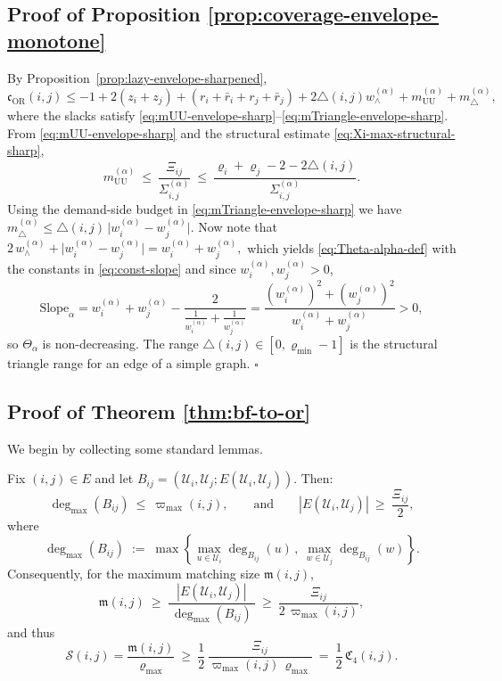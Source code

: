 \documentclass[twoside,11pt]{article}
\numberwithin{equation}{section}
\numberwithin{theorem}{section}
\numberwithin{example}{section}
\begin{document}
\subsection{Proof of Proposition \ref{prop:coverage-envelope-monotone}}
By Proposition~\ref{prop:lazy-envelope-sharpened},
\(
\mathfrak c_{\mathrm{OR}}(i,j) \le
-1+2(z_i+z_j)
+(r_i+\bar r_i+r_j+\bar r_j)
+2\triangle(i,j)w^{(\alpha)}_\wedge
+m^{(\alpha)}_{\mathrm{UU}}
+m^{(\alpha)}_{\triangle},
\)
where the slacks satisfy \eqref{eq:mUU-envelope-sharp}--\eqref{eq:mTriangle-envelope-sharp}. From \eqref{eq:mUU-envelope-sharp} and the structural estimate \eqref{eq:Xi-max-structural-sharp},
\[
m^{(\alpha)}_{\mathrm{UU}}
\ \le\ \frac{\Xi_{ij}}{\Sigma^{(\alpha)}_{i,j}}
\ \le\ \frac{\varrho_i+\varrho_j-2-2\triangle(i,j)}{\Sigma^{(\alpha)}_{i,j}}.
\]
Using the demand-side budget in \eqref{eq:mTriangle-envelope-sharp} we have
\(
m^{(\alpha)}_{\triangle}\le\triangle(i,j)\,\bigl|w^{(\alpha)}_i-w^{(\alpha)}_j\bigr|.
\)
Now note that
\(
2\,w^{(\alpha)}_\wedge+\bigl|w^{(\alpha)}_i-w^{(\alpha)}_j\bigr|=w^{(\alpha)}_i+w^{(\alpha)}_j,
\)
which yields \eqref{eq:Theta-alpha-def} with the constants in \eqref{eq:const-slope} and since $w^{(\alpha)}_i,w^{(\alpha)}_j>0$,
\[
\mathrm{Slope}_\alpha
=w^{(\alpha)}_i+w^{(\alpha)}_j-\frac{2}{\frac{1}{w^{(\alpha)}_i}+\frac{1}{w^{(\alpha)}_j}}
=\frac{(w^{(\alpha)}_i)^2+(w^{(\alpha)}_j)^2}{\,w^{(\alpha)}_i+w^{(\alpha)}_j\,}>0,
\]
so $\Theta_\alpha$ is non-decreasing. The range $\triangle(i,j)\in[0,\varrho_{\min}-1]$ is the structural triangle range for an edge of a simple graph. 
\hfill $\square$

\subsection{Proof of Theorem \ref{thm:bf-to-or}}
We begin by collecting some standard lemmas.

\begin{lemma}
\label{lem:matching-from-C4-rigorous}
Fix $(i,j)\in E$ and let 
\(
B_{ij}=(\mathcal U_i,\mathcal U_j;E(\mathcal U_i,\mathcal U_j)).
\)
Then:
\begin{equation}
\label{eq:Delta-max-UB}
\operatorname{deg}_{\max}(B_{ij})\ \le\ \varpi_{\max}(i,j),
\qquad
\text{and}\qquad
|E(\mathcal U_i,\mathcal U_j)|\ \ge\ \frac{\Xi_{ij}}{2},
\end{equation}
where
\[
\operatorname{deg}_{\max}(B_{ij})
\;:=\;
\max\!\left\{
\max_{u\in\mathcal U_i}\deg_{B_{ij}}(u)\,,\ 
\max_{w\in\mathcal U_j}\deg_{B_{ij}}(w)
\right\}.
\]
Consequently, for the maximum matching size $\mathfrak m(i,j)$,
\begin{equation}
\label{eq:m-lb}
\mathfrak m(i,j)\ \ge\ \frac{|E(\mathcal U_i,\mathcal U_j)|}{\ \operatorname{deg}_{\max}(B_{ij})\ }\ \ge\ \frac{\Xi_{ij}}{2\,\varpi_{\max}(i,j)},
\end{equation}
and thus
\begin{equation}
\label{eq:S-lb-by-C4}
\mathscr S(i,j)=\frac{\mathfrak m(i,j)}{\varrho_{\max}}\ \ge\ \frac12\,\frac{\Xi_{ij}}{\varpi_{\max}(i,j)\,\varrho_{\max}}\ =\ \frac12\,\mathfrak C_4(i,j).
\end{equation}
\end{lemma}
\end{document}
